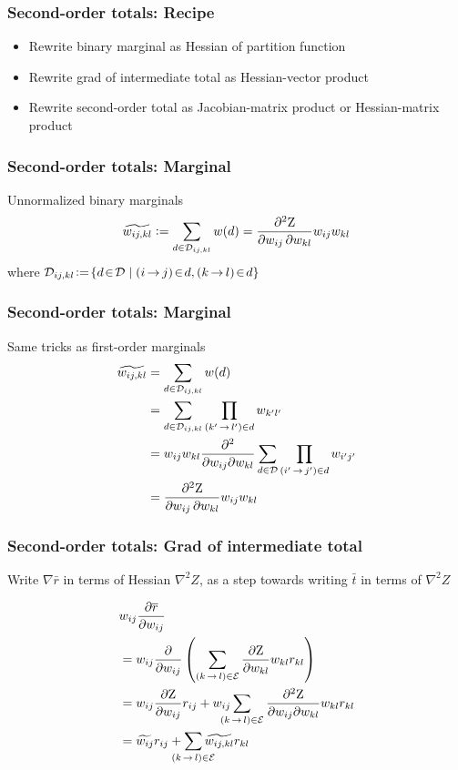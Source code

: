 \documentclass{beamer}
\newcommand{\defeq}{\vcentcolon=}
\begin{document}
\begin{frame}
\frametitle{Second-order totals: Recipe}
\begin{itemize}
\item Rewrite binary marginal as Hessian of partition function
\item Rewrite grad of intermediate total as Hessian-vector product
\item Rewrite second-order total as Jacobian-matrix product or Hessian-matrix product
\end{itemize}
\end{frame}


\begin{frame}
\frametitle{Second-order totals: Marginal}
Unnormalized binary marginals
\begin{equation}
    \totalw{ij,kl}\defeq\sum_{\tree\in\inc{ij,kl}}\wtree{\tree} 
    =\frac{\partial^2 \wbar}{\partial \wedge{ij}\,\partial\wedge{kl}}\wedge{ij}\wedge{kl}
\end{equation}
where $\inc{ij,kl} \!\defeq\! \{ \tree \!\in\! \st \mid \edgeij \!\in\! \tree, \edgekl \!\in\! \tree \}$
\end{frame}

\begin{frame}
\frametitle{Second-order totals: Marginal}
Same tricks as first-order marginals
\begin{align*}
    {\widetilde{w_{ij,kl}}} &= \sum_{{d}\in{\mathcal{D}_{ij,kl}}}{w({d})} \\
    &= \sum_{{d}\in{\mathcal{D}_{ij,kl}}}\prod_{{(k'\,{\rightarrow}\,l')}\in{d}}{w_{k'l'}} \\
    &= {w_{ij}}{w_{kl}}\frac{\partial^2}{\partial{w_{ij}}\partial{w_{kl}}} \sum_{{d} \in {\mathcal{D}}}\prod_{{(i'\,{\rightarrow}\,j')}\in{d}}{w_{i'j'}} \\
    &= \frac{\partial^2 {\mathrm{Z}}}{\partial {w_{ij}}\,\partial{w_{kl}}}{w_{ij}}{w_{kl}}
\end{align*}
\end{frame}

\begin{frame}
\frametitle{Second-order totals: Grad of intermediate total}
Write $\nabla \bar{r}$ in terms of Hessian $\nabla^2 Z$, as a step towards writing
    $\bar{t}$ in terms of $\nabla^2 Z$

\begin{align*}
    &\wedge{ij}\frac{\partial\rbar}{\partial \wedge{ij}} \\
    &= \wedge{ij}\frac{\partial}{\partial\wedge{ij}}\left(\sum_{\edgekl\in\edges}\frac{\partial\wbar}{\partial\wedge{kl}}\wedge{kl}\redge{kl}\right) \\
    &= \wedge{ij}\frac{\partial\wbar}{\partial\wedge{ij}}\redge{ij} + \wedge{ij}\smashoperator{\sum_{\edgekl\in\edges}}\ \ \ \frac{\partial^2\wbar}{\partial\wedge{ij}\partial\wedge{kl}}\wedge{kl}\redge{kl} \\ 
    &= \totalw{ij}\redge{ij} + \smashoperator{\sum_{\edgekl\in\edges}}\totalw{ij,kl}\redge{kl}
\end{align*}
\end{frame}
\end{document}
